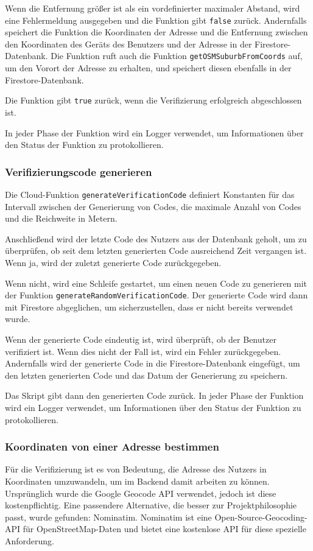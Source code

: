 Wenn die Entfernung größer ist als ein vordefinierter maximaler Abstand, wird eine Fehlermeldung ausgegeben und die Funktion gibt \texttt{false} zurück. Andernfalls speichert die Funktion die Koordinaten der Adresse und die Entfernung zwischen den Koordinaten des Geräts des Benutzers und der Adresse in der Firestore-Datenbank. Die Funktion ruft auch die Funktion \texttt{getOSMSuburbFromCoords} auf, um den Vorort der Adresse zu erhalten, und speichert diesen ebenfalls in der Firestore-Datenbank.

Die Funktion gibt \texttt{true} zurück, wenn die Verifizierung erfolgreich abgeschlossen ist.

In jeder Phase der Funktion wird ein Logger verwendet, um Informationen über den Status der Funktion zu protokollieren.

\subsubsection{Verifizierungscode generieren}
Die Cloud-Funktion \texttt{generateVerificationCode} definiert Konstanten für das Intervall zwischen der Generierung von Codes, die maximale Anzahl von Codes und die Reichweite in Metern.

Anschließend wird der letzte Code des Nutzers aus der Datenbank geholt, um zu überprüfen, ob seit dem letzten generierten Code ausreichend Zeit vergangen ist. Wenn ja, wird der zuletzt generierte Code zurückgegeben.

Wenn nicht, wird eine Schleife gestartet, um einen neuen Code zu generieren mit der Funktion \texttt{generateRandomVerificationCode}. Der generierte Code wird dann mit Firestore abgeglichen, um sicherzustellen, dass er nicht bereits verwendet wurde.

Wenn der generierte Code eindeutig ist, wird überprüft, ob der Benutzer verifiziert ist. Wenn dies nicht der Fall ist, wird ein Fehler zurückgegeben. Andernfalls wird der generierte Code in die Firestore-Datenbank eingefügt, um den letzten generierten Code und das Datum der Generierung zu speichern.

Das Skript gibt dann den generierten Code zurück. In jeder Phase der Funktion wird ein Logger verwendet, um Informationen über den Status der Funktion zu protokollieren.

\subsubsection{Koordinaten von einer Adresse bestimmen}
Für die Verifizierung ist es von Bedeutung, die Adresse des Nutzers in Koordinaten umzuwandeln, um im Backend damit arbeiten zu können. Ursprünglich wurde die Google Geocode API verwendet, jedoch ist diese kostenpflichtig. Eine passendere Alternative, die besser zur Projektphilosophie passt, wurde gefunden: Nominatim. Nominatim ist eine Open-Source-Geocoding-API für OpenStreetMap-Daten und bietet eine kostenlose API für diese spezielle Anforderung.

